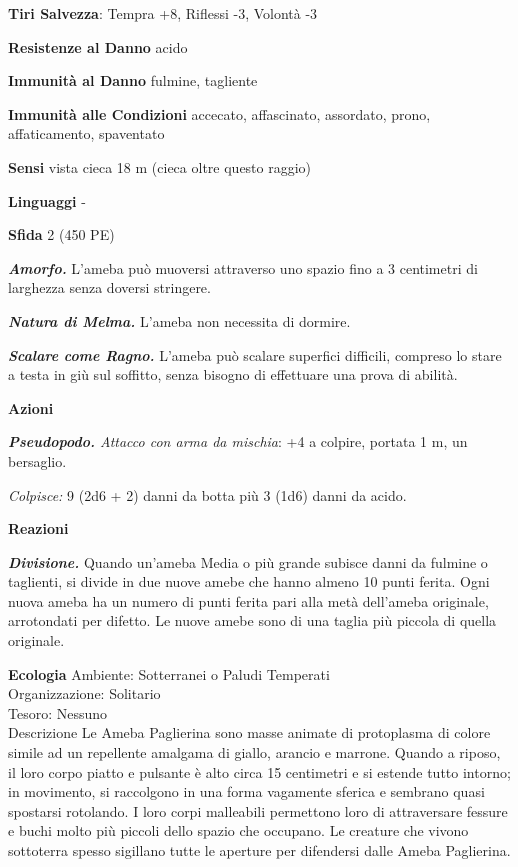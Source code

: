 \begin{multicols}{2}
\textbf{Tiri Salvezza}: Tempra +8, Riflessi -3, Volontà -3

\textbf{Resistenze al Danno} acido

\textbf{Immunità al Danno} fulmine, tagliente

\textbf{Immunità alle Condizioni} accecato, affascinato, assordato, prono, affaticamento, spaventato

\textbf{Sensi} vista cieca 18 m (cieca oltre questo raggio)

\textbf{Linguaggi} -

\textbf{Sfida} 2 (450 PE)

\emph{\textbf{Amorfo.}} L'ameba può muoversi attraverso uno spazio fino a 3 centimetri di larghezza senza doversi stringere.

\emph{\textbf{Natura di Melma.}} L'ameba non necessita di dormire.

\emph{\textbf{Scalare come Ragno.}} L'ameba può scalare superfici
difficili, compreso lo stare a testa in giù sul soffitto, senza bisogno
di effettuare una prova di abilità.

\textbf{Azioni}

\emph{\textbf{Pseudopodo.} Attacco con arma da mischia}: +4 a colpire,
portata 1 m, un bersaglio.

\emph{Colpisce:} 9 (2d6 + 2) danni da botta più 3 (1d6) danni da
acido.

\textbf{Reazioni}

\emph{\textbf{Divisione.}} Quando un'ameba Media o più grande subisce danni da fulmine o taglienti, si divide in due nuove amebe che hanno almeno 10 punti ferita. Ogni nuova ameba ha un numero di punti ferita pari alla metà dell'ameba originale, arrotondati per difetto. Le nuove amebe sono di una taglia più piccola di quella originale.

\textbf{Ecologia}
Ambiente: Sotterranei o Paludi Temperati\\
Organizzazione: Solitario\\
Tesoro: Nessuno\\
Descrizione
Le Ameba Paglierina sono masse animate di protoplasma di colore simile ad un repellente amalgama di giallo, arancio e marrone. Quando a riposo, il loro corpo piatto e pulsante è alto circa 15 centimetri e si estende tutto intorno; in movimento, si raccolgono in una forma vagamente sferica e sembrano quasi spostarsi rotolando. I loro corpi malleabili permettono loro di attraversare fessure e buchi molto più piccoli dello spazio che occupano. Le creature che vivono sottoterra spesso sigillano tutte le aperture per difendersi dalle Ameba Paglierina.\\


\end{multicols}
